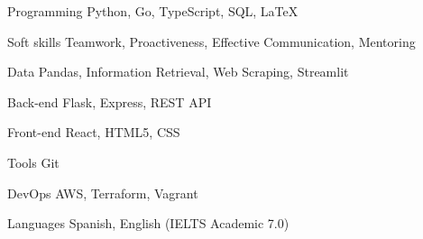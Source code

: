 

\begin{cvskills}

  \cvskill
    {Programming} %
    {Python, Go, TypeScript, SQL, \LaTeX} %

  \cvskill
    {Soft skills} %
    {Teamwork, Proactiveness, Effective Communication, Mentoring} %

  \cvskill
    {Data} %
    {Pandas, Information Retrieval, Web Scraping, Streamlit} %

  \cvskill
    {Back-end} %
    {Flask, Express, REST API} %

  \cvskill
    {Front-end} %
    {React, HTML5, CSS} %

  \cvskill
    {Tools} %
    {Git} %

  \cvskill
    {DevOps} %
    {AWS, Terraform, Vagrant} %

  \cvskill
    {Languages} %
    {Spanish, English (IELTS Academic 7.0)} %

\end{cvskills}
